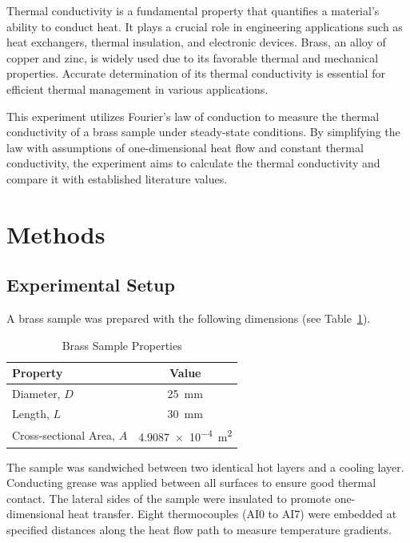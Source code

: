 \documentclass[12pt]{article}
\begin{document}
Thermal conductivity is a fundamental property that quantifies a material's ability to conduct heat. It plays a crucial role in engineering applications such as heat exchangers, thermal insulation, and electronic devices. Brass, an alloy of copper and zinc, is widely used due to its favorable thermal and mechanical properties. Accurate determination of its thermal conductivity is essential for efficient thermal management in various applications.

This experiment utilizes Fourier's law of conduction to measure the thermal conductivity of a brass sample under steady-state conditions. By simplifying the law with assumptions of one-dimensional heat flow and constant thermal conductivity, the experiment aims to calculate the thermal conductivity and compare it with established literature values.

\section{Methods}

\subsection{Experimental Setup}

A brass sample was prepared with the following dimensions (see Table~\ref{tab:sample_properties}).

\begin{table}[H]
    \centering
    \caption{Brass Sample Properties}
    \label{tab:sample_properties}
    \begin{tabular}{lc}
        \toprule
        Property & Value \\
        \midrule
        Diameter, $D$ & \SI{25}{\milli\meter} \\
        Length, $L$ & \SI{30}{\milli\meter} \\
        Cross-sectional Area, $A$ & \SI{4.9087e-4}{\square\meter} \\
        \bottomrule
    \end{tabular}
\end{table}

The sample was sandwiched between two identical hot layers and a cooling layer. Conducting grease was applied between all surfaces to ensure good thermal contact. The lateral sides of the sample were insulated to promote one-dimensional heat transfer. Eight thermocouples (AI0 to AI7) were embedded at specified distances along the heat flow path to measure temperature gradients.
\end{document}
